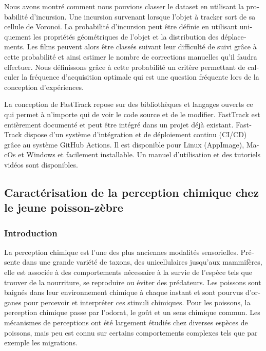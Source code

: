 \begin{otherlanguage}{french}
Nous avons montré comment nous pouvions classer le dataset en utilisant la probabilité d'incursion. Une incursion survenant lorsque l'objet à tracker sort de sa cellule de Voronoï. La probabilité d'incursion peut être définie en utilisant uniquement les propriétés géométriques de l'objet et la distribution des déplacements. Les films peuvent alors être classés suivant leur difficulté de suivi grâce à cette probabilité et ainsi estimer le nombre de corrections manuelles qu'il faudra effectuer. Nous définissons grâce à cette probabilité un critère permettant de calculer la fréquence d'acquisition optimale qui est une question fréquente lors de la conception d'expériences.

La conception de FastTrack repose sur des bibliothèques et langages ouverts ce qui permet à n'importe qui de voir le code source et de le modifier. FastTrack est entièrement documenté et peut être intégré dans un projet déjà existant. FastTrack dispose d'un système d'intégration et de déploiement continu (CI/CD) grâce au système GitHub Actions. Il est disponible pour Linux (AppImage), MacOs et Windows et facilement installable. Un manuel d'utilisation et des tutoriels vidéos sont disponibles.


\subsection*{Caractérisation de la perception chimique chez le jeune poisson-zèbre}

\subsubsection*{Introduction}
La perception chimique est l'une des plus anciennes modalités sensorielles. Présente dans une grande variété de taxons, des unicellulaires jusqu'aux mammifères, elle est associée à des comportements nécessaire à la survie de l'espèce tels que trouver de la nourriture, se reproduire ou éviter des prédateurs. Les poissons sont baignés dans leur environnement chimique à chaque instant et sont pourvus d'organes pour percevoir et interpréter ces stimuli chimiques. Pour les poissons, la perception chimique passe par l'odorat, le goût et un sens chimique commun. Les mécanismes de perceptions ont été largement étudiés chez diverses espèces de poissons, mais peu est connu sur certains comportements complexes tels que par exemple les migrations.


\end{otherlanguage}
